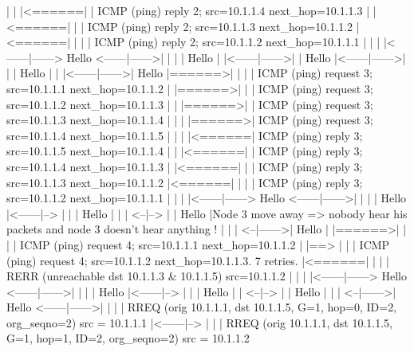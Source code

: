 \begin{DoxyVerb}
           |       |       |<======|       |        ICMP (ping) reply 2; src=10.1.1.4 next_hop=10.1.1.3
           |       |<======|       |       |        ICMP (ping) reply 2; src=10.1.1.3 next_hop=10.1.1.2
           |<======|       |       |       |        ICMP (ping) reply 2; src=10.1.1.2 next_hop=10.1.1.1
           |       |       |       |<------|------> Hello
    <------|------>|       |       |       |        Hello
           |       |<------|------>|       |        Hello
           |<------|------>|       |       |        Hello
           |       |       |<------|------>|        Hello
           |======>|       |       |       |        ICMP (ping) request 3; src=10.1.1.1 next_hop=10.1.1.2
           |       |======>|       |       |        ICMP (ping) request 3; src=10.1.1.2 next_hop=10.1.1.3
           |       |       |======>|       |        ICMP (ping) request 3; src=10.1.1.3 next_hop=10.1.1.4
           |       |       |       |======>|        ICMP (ping) request 3; src=10.1.1.4 next_hop=10.1.1.5
           |       |       |       |<======|        ICMP (ping) reply 3; src=10.1.1.5 next_hop=10.1.1.4
           |       |       |<======|       |        ICMP (ping) reply 3; src=10.1.1.4 next_hop=10.1.1.3
           |       |<======|       |       |        ICMP (ping) reply 3; src=10.1.1.3 next_hop=10.1.1.2
           |<======|       |       |       |        ICMP (ping) reply 3; src=10.1.1.2 next_hop=10.1.1.1
           |       |       |       |<------|------> Hello
    <------|------>|       |       |       |        Hello
           |<------|-->    |       |       |        Hello   |
           |       |    <--|-->    |       |        Hello   |Node 3 move away => nobody hear his packets and node 3 doesn't hear anything !
           |       |       |    <--|------>|        Hello   |
           |======>|       |       |       |        ICMP (ping) request 4; src=10.1.1.1 next_hop=10.1.1.2
           |       |==>    |       |       |        ICMP (ping) request 4; src=10.1.1.2 next_hop=10.1.1.3.   7 retries.
           |<======|       |       |       |        RERR (unreachable dst 10.1.1.3 & 10.1.1.5) src=10.1.1.2
           |       |       |       |<------|------> Hello
    <------|------>|       |       |       |        Hello
           |<------|-->    |       |       |        Hello
           |       |    <--|-->    |       |        Hello
           |       |       |    <--|------>|        Hello
    <------|------>|       |       |       |        RREQ (orig 10.1.1.1, dst 10.1.1.5, G=1, hop=0, ID=2, org_seqno=2) src = 10.1.1.1
           |<------|-->    |       |       |        RREQ (orig 10.1.1.1, dst 10.1.1.5, G=1, hop=1, ID=2, org_seqno=2) src = 10.1.1.2

\end{DoxyVerb}
